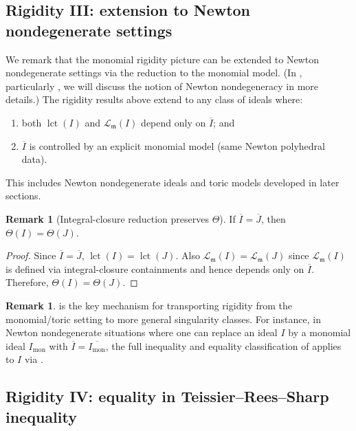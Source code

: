 \documentclass[12pt]{amsart}
\newcommand{\m}{\mathfrak m}
\newcommand{\lct}{\operatorname{\mathrm{lct}}}
\newcommand{\Loj}{\mathcal{L}} %
\theoremstyle{plain}
\theoremstyle{definition}
\newtheorem{remark}[theorem]{Remark}
\numberwithin{equation}{section}
\begin{document}
\subsection{Rigidity III: extension to Newton nondegenerate settings}
We remark that the monomial rigidity picture can be extended to Newton nondegenerate
settings via the reduction to the monomial model. (In , particularly , we will discuss the notion of Newton nondegeneracy in more details.)
The rigidity results above extend to any class of ideals where:
\begin{enumerate}[label=(\alph*),leftmargin=2em]
	\item both $\lct(I)$ and $\Loj_\m(I)$ depend only on $\overline I$; and
	\item $\overline I$ is controlled by an explicit monomial model (same Newton polyhedral data).
\end{enumerate}
This includes Newton nondegenerate ideals and toric models developed in later sections.

\begin{remark}[Integral-closure reduction preserves $\Theta$]\label{prop:theta-ic}
	If $\overline I=\overline J$, then $\Theta(I)=\Theta(J)$.
\end{remark}

\begin{proof}
	Since $\overline{I} = \overline{J}$, $\lct(I)=\lct(J)$. Also $\Loj_\m(I)=\Loj_\m(J)$ since
	$\Loj_\m(I)$ is defined via integral-closure containments and hence depends only on $\overline I$.
	Therefore, $\Theta(I)=\Theta(J)$.
\end{proof}

\begin{remark}\label{rem:theta-ic-bridge}
	 is the key mechanism for transporting rigidity from the
	monomial/toric setting to more general singularity classes.
	For instance, in Newton nondegenerate situations where one can replace an ideal $I$ by a
	monomial ideal $I_{\mathrm{mon}}$ with $\overline{I}=\overline{I_{\mathrm{mon}}}$, the full
	inequality and equality classification of  applies to $I$
	via .
\end{remark}


\subsection{Rigidity IV: equality in Teissier--Rees--Sharp inequality}\label{subsec:rigidity-TRS}
\end{document}
